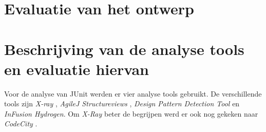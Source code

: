 \documentclass[i1]{oss}
\begin{document}
\section{Evaluatie van het ontwerp}


\section{Beschrijving van de analyse tools en evaluatie hiervan}

Voor de analyse van JUnit werden er vier analyse tools gebruikt. De verschillende tools zijn \emph{X-ray} \cite{X-Ray}, \emph{AgileJ Structureviews} \cite{AgileJ Structureviews} , \emph{Design Pattern Detection Tool} \cite{Design Pattern Detection Tool} en \emph{InFusion Hydrogen}. Om \emph{X-Ray} beter de begrijpen werd er ook nog gekeken naar \emph{CodeCity} \cite{CodeCity}.
\end{document}

